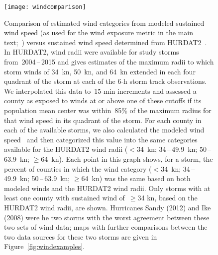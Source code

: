 \begin{figure}[tbhp!]
\centering
\texttt{[image: windcomparison]}
\caption{Comparison of estimated wind categories from modeled sustained wind
speed (as used for the wind exposure metric in the main
text;~\parencite{stormwindmodel}) versus sustained wind speed determined from
\ac{HURDAT2}~\parencite{landsea2013}. In \ac{HURDAT2}, wind radii were
available for study storms from~2004\,--\,2015 and gives estimates of the
maximum radii to which storm winds of 34~\si{\knot}, 50~\si{\knot}, and
64~\si{\knot} extended in each four quadrant of the storm at each of the
6-\si{\hour} storm track observations. We interpolated this data
to~15-\si{\minute} increments and assessed a county as exposed to winds at or
above one of these cutoffs if its population mean center was within~85\% of the
maximum radius for that wind speed in its quadrant of the storm. For each
county in each of the available storms, we also calculated the modeled wind
speed~\parencite{stormwindmodel} and then categorized this value into the same
categories available for the \ac{HURDAT2} wind radii ($<$34~\si{\knot};
34\,--\,49.9~\si{\knot}; 50\,--\,63.9~\si{\knot}; $\ge$64~\si{\knot}). Each
point in this graph shows, for a storm, the percent of counties in which the
wind category ($<$34~\si{\knot}; 34\,--\,49.9~\si{\knot};
50\,--\,63.9~\si{\knot}; $\ge$64~\si{\knot}) was the same based on both modeled
winds and the \ac{HURDAT2} wind radii. Only storms with at least one county
with sustained wind of~$\ge$34 \si{\knot}, based on the \ac{HURDAT2} wind
radii, are shown. Hurricanes Sandy (2012) and Ike (2008) were he two storms
with the worst agreement between these two sets of wind data; maps with further
comparisons between the two data sources for these two storms are given in
Figure~\ref{fig:windexamples}.}
\label{fig:windcomparison}
\end{figure}

